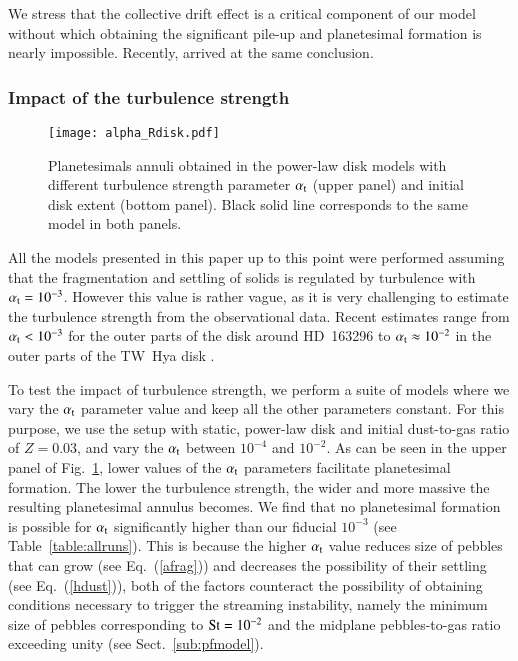 \documentclass{aa}
\begin{document}
We stress that the collective drift effect is a critical component of our model without which obtaining the significant pile-up and planetesimal formation is nearly impossible. Recently, \citet{2017A&A...602A..21S} arrived at the same conclusion.  

\subsubsection{Impact of the turbulence strength}\label{sub:alpha}
  
  \begin{figure}
   \centering
   \texttt{[image: alpha\_Rdisk.pdf]}
      \caption{Planetesimals annuli obtained in the power-law disk models with different turbulence strength parameter $\alpha_{\rm t}$ (upper panel) and initial disk extent (bottom panel). Black solid line corresponds to the same model in both panels. }
      \label{fig:alpha_Rdisk}
\end{figure}

All the models presented in this paper up to this point were performed assuming that the fragmentation and settling of solids is regulated by turbulence with $\alpha_{\rm t}=10^{-3}$. 
However this value is rather vague, as it is very challenging to estimate the turbulence strength from the observational data. Recent estimates range from $\alpha_{\rm t}<10^{-3}$ for the outer parts of the disk around HD~163296 \citep{2015ApJ...813...99F} to $\alpha_{\rm t}\approx10^{-2}$ in the outer parts of the TW~Hya disk \citep{2016A&A...592A..49T}.

To test the impact of turbulence strength, we perform a suite of models where we vary the $\alpha_{\rm t}$ parameter value and keep all the other parameters constant. For this purpose, we use the setup with static, power-law disk and initial dust-to-gas ratio of $Z=0.03$, and vary the $\alpha_{\rm t}$ between $10^{-4}$ and $10^{-2}$. As can be seen in the upper panel of Fig.~\ref{fig:alpha_Rdisk}, lower values of the $\alpha_{\rm t}$ parameters facilitate planetesimal formation. The lower the turbulence strength, the wider and more massive the resulting planetesimal annulus becomes. We find that no planetesimal formation is possible for $\alpha_{\rm t}$ significantly higher than our fiducial $10^{-3}$ (see Table~\ref{table:allruns}). This is because the higher $\alpha_{\rm t}$ value reduces size of pebbles that can grow (see Eq.~(\ref{afrag})) and decreases the possibility of their settling (see Eq.~(\ref{hdust})), both of the factors counteract the possibility of obtaining conditions necessary to trigger the streaming instability, namely the minimum size of pebbles corresponding to ${\rm St}=10^{-2}$ and the midplane pebbles-to-gas ratio exceeding unity (see Sect.~\ref{sub:pfmodel}).
\end{document}
